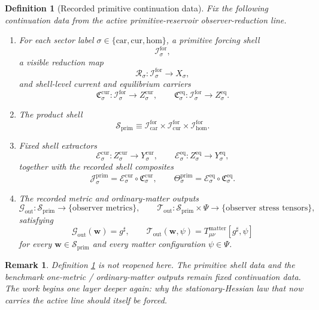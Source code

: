 \documentclass[11pt]{article}
\newcommand{\CompletedMetric}{g^{\sharp}}
\newcommand{\Car}{\mathrm{car}}
\newcommand{\Cur}{\mathrm{cur}}
\newcommand{\Hom}{\mathrm{hom}}
\newcommand{\ForSpace}[1]{\mathcal I_{#1}^{\mathrm{for}}}
\newcommand{\PrimShell}{\mathcal S_{\mathrm{prim}}}
\newcommand{\Reduction}[1]{\mathcal R_{#1}}
\newcommand{\CurrentCarrier}[1]{\mathfrak C_{#1}^{\mathrm{cur}}}
\newcommand{\EqCarrier}[1]{\mathfrak C_{#1}^{\mathrm{eq}}}
\newcommand{\CurrentExtract}[1]{\mathscr E_{#1}^{\mathrm{cur}}}
\newcommand{\EqExtract}[1]{\mathscr E_{#1}^{\mathrm{eq}}}
\newcommand{\PrimCurrent}[1]{\mathcal J_{#1}^{\mathrm{prim}}}
\newcommand{\PrimTheta}[1]{\Theta_{#1}^{\mathrm{prim}}}
\newcommand{\MetricOut}{\mathscr G_{\mathrm{out}}}
\newcommand{\MatterOut}{\mathscr T_{\mathrm{out}}}
\newtheorem{definition}{Definition}
\newtheorem{remark}{Remark}
\begin{document}
\begin{definition}[Recorded primitive continuation data]
\label{def:fixed}
Fix the following continuation data from the active primitive-reservoir observer-reduction line.
\begin{enumerate}
    \item For each sector label \(\sigma\in\{\Car,\Cur,\Hom\}\), a primitive forcing shell
    \[
    \ForSpace{\sigma},
    \]
    a visible reduction map
    \[
    \Reduction{\sigma}:\ForSpace{\sigma}\to X_{\sigma},
    \]
    and shell-level current and equilibrium carriers
    \[
    \CurrentCarrier{\sigma}:\ForSpace{\sigma}\to Z_{\sigma}^{\mathrm{cur}},
    \qquad
    \EqCarrier{\sigma}:\ForSpace{\sigma}\to Z_{\sigma}^{\mathrm{eq}}.
    \]
    \item The product shell
    \[
    \PrimShell
    \equiv
    \ForSpace{\Car}\times \ForSpace{\Cur}\times \ForSpace{\Hom}.
    \]
    \item Fixed shell extractors
    \[
    \CurrentExtract{\sigma}:Z_{\sigma}^{\mathrm{cur}}\to Y_{\sigma}^{\mathrm{cur}},
    \qquad
    \EqExtract{\sigma}:Z_{\sigma}^{\mathrm{eq}}\to Y_{\sigma}^{\mathrm{eq}},
    \]
    together with the recorded shell composites
    \begin{equation}
    \PrimCurrent{\sigma}
    =
    \CurrentExtract{\sigma}\circ \CurrentCarrier{\sigma},
    \qquad
    \PrimTheta{\sigma}
    =
    \EqExtract{\sigma}\circ \EqCarrier{\sigma}.
    \label{eq:primcomposites}
    \end{equation}
    \item The recorded metric and ordinary-matter outputs
    \[
    \MetricOut:\PrimShell\to\{\text{observer metrics}\},
    \qquad
    \MatterOut:\PrimShell\times\Psi\to\{\text{observer stress tensors}\},
    \]
    satisfying
    \begin{equation}
    \MetricOut(\mathbf w)=\CompletedMetric,
    \qquad
    \MatterOut(\mathbf w,\psi)
    =
    T_{\mu\nu}^{\mathrm{matter}}[\CompletedMetric,\psi]
    \label{eq:fixedoutputs}
    \end{equation}
    for every \(\mathbf w\in\PrimShell\) and every matter configuration \(\psi\in\Psi\).
\end{enumerate}
\end{definition}

\begin{remark}
Definition \ref{def:fixed} is not reopened here. The primitive shell data and the benchmark one-metric / ordinary-matter outputs remain fixed continuation data. The work begins one layer deeper again: why the stationary-Hessian law that now carries the active line should itself be forced.
\end{remark}
\end{document}
